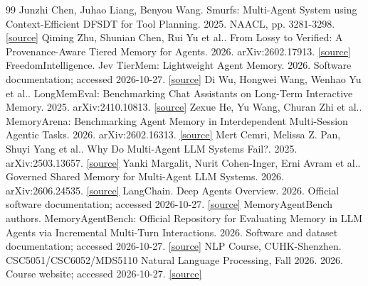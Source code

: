 \documentclass[UTF8,a4paper,zihao=5]{ctexart}
\begin{document}
\begin{thebibliography}{99}
\small
{}Junzhi Chen, Juhao Liang, Benyou Wang. Smurfs: Multi-Agent System using Context-Efficient DFSDT for Tool Planning. 2025. NAACL, pp. 3281-3298. \href{https://aclanthology.org/2025.naacl-long.169/}{[source]}
Qiming Zhu, Shunian Chen, Rui Yu et al.. From Lossy to Verified: A Provenance-Aware Tiered Memory for Agents. 2026. arXiv:2602.17913. \href{https://arxiv.org/abs/2602.17913}{[source]}
FreedomIntelligence. Jev TierMem: Lightweight Agent Memory. 2026. Software documentation; accessed 2026-10-27. \href{https://github.com/FreedomIntelligence/Tiermem/tree/d0d3896e917117ba0fcc1501e2b2dae891d2a2e3/jev_tiermem}{[source]}
Di Wu, Hongwei Wang, Wenhao Yu et al.. LongMemEval: Benchmarking Chat Assistants on Long-Term Interactive Memory. 2025. arXiv:2410.10813. \href{https://arxiv.org/abs/2410.10813}{[source]}
Zexue He, Yu Wang, Churan Zhi et al.. MemoryArena: Benchmarking Agent Memory in Interdependent Multi-Session Agentic Tasks. 2026. arXiv:2602.16313. \href{https://arxiv.org/abs/2602.16313}{[source]}
Mert Cemri, Melissa Z. Pan, Shuyi Yang et al.. Why Do Multi-Agent LLM Systems Fail?. 2025. arXiv:2503.13657. \href{https://arxiv.org/abs/2503.13657}{[source]}
Yanki Margalit, Nurit Cohen-Inger, Erni Avram et al.. Governed Shared Memory for Multi-Agent LLM Systems. 2026. arXiv:2606.24535. \href{https://arxiv.org/abs/2606.24535}{[source]}
LangChain. Deep Agents Overview. 2026. Official software documentation; accessed 2026-10-27. \href{https://docs.langchain.com/oss/python/deepagents/overview}{[source]}
MemoryAgentBench authors. MemoryAgentBench: Official Repository for Evaluating Memory in LLM Agents via Incremental Multi-Turn Interactions. 2026. Software and dataset documentation; accessed 2026-10-27. \href{https://github.com/HUST-AI-HYZ/MemoryAgentBench}{[source]}
NLP Course, CUHK-Shenzhen. CSC5051/CSC6052/MDS5110 Natural Language Processing, Fall 2026. 2026. Course website; accessed 2026-10-27. \href{https://nlp-course-cuhksz.github.io/}{[source]}
\end{thebibliography}
\end{document}
